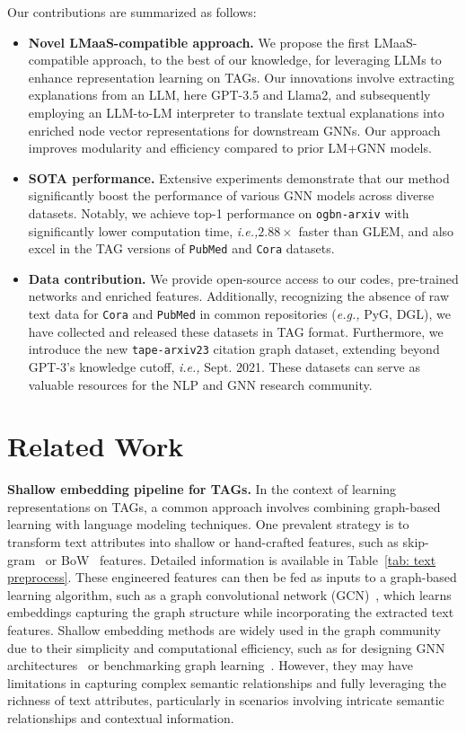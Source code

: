 \documentclass{article}
\newcommand{\ie}{\emph{i.e.,}\xspace}
\newcommand{\eg}{\emph{e.g.,}\xspace}
\begin{document}
Our contributions are summarized as follows:
\begin{itemize}
    \item \textbf{Novel LMaaS-compatible approach.} We propose the first LMaaS-compatible approach, to the best of our knowledge, for leveraging LLMs to enhance representation learning on TAGs. Our innovations involve extracting explanations from an LLM, here GPT-3.5 and Llama2, and subsequently employing an LLM-to-LM interpreter to translate textual explanations into enriched node vector representations for downstream GNNs. 
Our approach improves modularity and efficiency compared to prior LM+GNN models.
    \item \textbf{SOTA performance.} Extensive experiments demonstrate that our {method} significantly boost the performance of various GNN models across diverse datasets. 
    Notably, we achieve top-1 performance on \texttt{ogbn-arxiv} with significantly lower computation time, {\ie $2.88\times$ faster than GLEM}, and also excel in the TAG versions of \texttt{PubMed} and \texttt{Cora} datasets. 
    \item \textbf{Data contribution.} We provide open-source access to our codes, pre-trained networks and enriched features. Additionally, recognizing the absence of raw text data for \texttt{Cora} and \texttt{PubMed} in common repositories (\eg PyG, DGL), we have collected and released these datasets in TAG format. Furthermore, we introduce the new \texttt{tape-arxiv23} citation graph dataset, extending beyond GPT-3's knowledge cutoff, \ie Sept. 2021. These datasets can serve as valuable resources for the NLP and GNN research community.
\end{itemize}



\section{Related Work}

\textbf{Shallow embedding pipeline for TAGs.}
In the context of learning representations on TAGs, a common approach involves combining graph-based learning with language modeling techniques.
One prevalent strategy is to transform text attributes into shallow or hand-crafted features, such as skip-gram~\citep{mikolov2013distributed_skipgram} or BoW~\citep{harris1985distributional_bow} features. Detailed information is available in Table~\ref{tab: text preprocess}. These engineered features can then be fed as inputs to a graph-based learning algorithm, such as a graph convolutional network (GCN)~\citep{kipf2016semi_gcn}, which learns embeddings capturing the graph structure while incorporating the extracted text features. Shallow embedding methods are widely used in the graph community due to their simplicity and computational efficiency, such as for designing GNN architectures~\citep{velivckovic2017graph_gat, chiang2019cluster_gcn, velickovic2019deep_graph_informax, zhang2021graphless} or benchmarking graph learning~\citep{yang2016revisiting, hu2020open}. However, they may have limitations in capturing complex semantic relationships and fully leveraging the richness of text attributes, particularly in scenarios involving intricate semantic relationships and contextual information.
\end{document}
